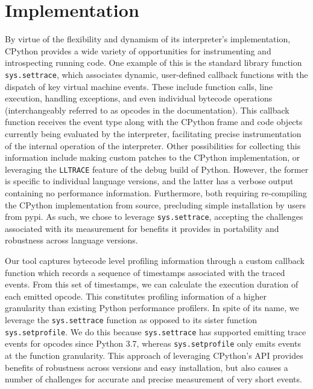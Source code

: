 \section{Implementation}
\label{sec:profiling-bytecode-implementation}

By virtue of the flexibility and dynamism of its interpreter's implementation, CPython provides a wide variety of opportunities for instrumenting and introspecting running code.
One example of this is the standard library function \texttt{sys.settrace}, which associates dynamic, user-defined callback functions with the dispatch of key virtual machine events. These include function calls, line execution, handling exceptions, and even individual bytecode operations (interchangeably referred to as opcodes in the documentation).
This callback function receives the event type along with the CPython frame and code objects currently being evaluated by the interpreter, facilitating precise instrumentation of the internal operation of the interpreter.
Other possibilities for collecting this information include making custom patches to the CPython implementation, or leveraging the \texttt{LLTRACE} feature of the debug build of Python.
However, the former is specific to individual language versions, and the latter has a verbose output containing no performance information. Furthermore, both requiring re-compiling the CPython implementation from source, precluding simple installation by users from \ac{pypi}.
As such, we chose to leverage \texttt{sys.settrace}, accepting the challenges associated with its measurement for benefits it provides in portability and robustness across language versions.

Our tool captures bytecode level profiling information through a custom callback function which records a sequence of timestamps associated with the traced events.
From this set of timestamps, we can calculate the execution duration of each emitted opcode. This constitutes profiling information of a higher granularity than existing Python performance profilers.
In spite of its name, we leverage the \texttt{sys.settrace} function as opposed to its sister function \texttt{sys.setprofile}. We do this because \texttt{sys.settrace} has supported emitting trace events for opcodes since Python 3.7, whereas \texttt{sys.setprofile} only emits events at the function granularity.
This approach of leveraging CPython's API provides benefits of robustness across versions and easy installation, but also causes a number of challenges for accurate and precise measurement of very short events.


